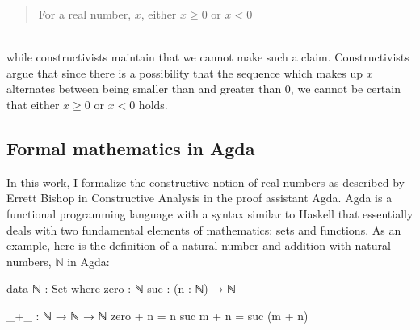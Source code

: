 \documentclass[11pt,a4paper]{article}
\begin{document}
\blockquote{For a real number, $x$, either $x \geq 0$ or $x < 0$}\\
while constructivists maintain that we cannot make such a claim. Constructivists argue that since there is a possibility that the sequence which makes up $x$ alternates between being smaller than and greater than 0, we cannot be certain that either $x \geq 0$ or $x < 0$ holds.

\subsection{Formal mathematics in Agda}\label{subsec: Agda}
In this work, I formalize the constructive notion of real numbers as described by Errett Bishop in Constructive Analysis \cite{bishop1985constructive} in the proof assistant Agda. Agda is a functional programming language with a syntax similar to Haskell that essentially deals with two fundamental elements of mathematics: sets and functions. As an example, here is the definition of a natural number and addition with natural numbers, $\mathbb{N}$ in Agda:\\

\begin{code}
data ℕ : Set where
  zero : ℕ
  suc  : (n : ℕ) → ℕ

_+_ : ℕ → ℕ → ℕ
zero  + n = n
suc m + n = suc (m + n)
\end{code}
\end{document}
